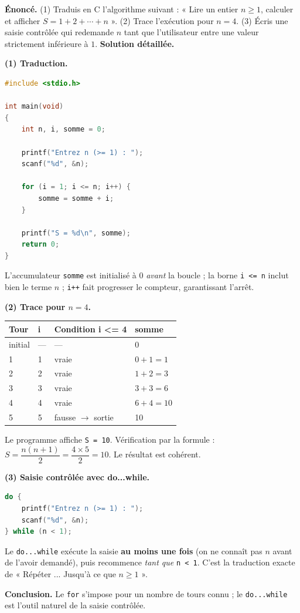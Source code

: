 \documentclass[11pt]{article}
\begin{document}
\begin{exoresolu}
\textbf{Énoncé.} (1) Traduis en C l'algorithme suivant : « Lire un entier $n \geq 1$, calculer et afficher $S = 1 + 2 + \cdots + n$ ». (2) Trace l'exécution pour $n = 4$. (3) Écris une saisie contrôlée qui redemande $n$ tant que l'utilisateur entre une valeur strictement inférieure à $1$.
\tcblower
\textbf{Solution détaillée.}

\textbf{(1) Traduction.}
\begin{lstlisting}[language=C]
#include <stdio.h>

int main(void)
{
    int n, i, somme = 0;

    printf("Entrez n (>= 1) : ");
    scanf("%d", &n);

    for (i = 1; i <= n; i++) {
        somme = somme + i;
    }

    printf("S = %d\n", somme);
    return 0;
}
\end{lstlisting}
L'accumulateur \texttt{somme} est initialisé à $0$ \emph{avant} la boucle ; la borne \texttt{i <= n} inclut bien le terme $n$ ; \texttt{i++} fait progresser le compteur, garantissant l'arrêt.

\textbf{(2) Trace pour $n = 4$.}
\begin{center}
\begin{tabularx}{\linewidth}{|l|X|X|X|}
\hline
\rowcolor{popblueL} \textbf{Tour} & \textbf{i} & \textbf{Condition i <= 4} & \textbf{somme} \\
\hline
initial & --- & --- & 0 \\
\hline
1 & 1 & vraie & $0+1=1$ \\
\hline
2 & 2 & vraie & $1+2=3$ \\
\hline
3 & 3 & vraie & $3+3=6$ \\
\hline
4 & 4 & vraie & $6+4=10$ \\
\hline
5 & 5 & fausse $\to$ sortie & 10 \\
\hline
\end{tabularx}
\end{center}
Le programme affiche \texttt{S = 10}. Vérification par la formule : $S = \dfrac{n(n+1)}{2} = \dfrac{4 \times 5}{2} = 10$. Le résultat est cohérent.

\textbf{(3) Saisie contrôlée avec do...while.}
\begin{lstlisting}[language=C]
do {
    printf("Entrez n (>= 1) : ");
    scanf("%d", &n);
} while (n < 1);
\end{lstlisting}
Le \texttt{do...while} exécute la saisie \textbf{au moins une fois} (on ne connaît pas $n$ avant de l'avoir demandé), puis recommence \emph{tant que} \texttt{n < 1}. C'est la traduction exacte de « Répéter ... Jusqu'à ce que $n \geq 1$ ».

\textbf{Conclusion.} Le \texttt{for} s'impose pour un nombre de tours connu ; le \texttt{do...while} est l'outil naturel de la saisie contrôlée.
\end{exoresolu}
\end{document}

